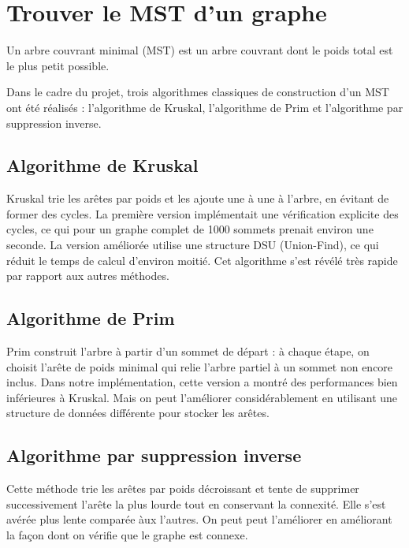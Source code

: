 \section{Trouver le MST d'un graphe}

Un arbre couvrant minimal (MST) est un arbre couvrant dont le poids total est le plus petit possible.

Dans le cadre du projet, trois algorithmes classiques de construction d'un MST ont été réalisés : l'algorithme de Kruskal, l'algorithme de Prim et l'algorithme par suppression inverse.

\subsection{Algorithme de Kruskal}
Kruskal trie les arêtes par poids et les ajoute une à une à l'arbre, en évitant de former des cycles.
La première version implémentait une vérification explicite des cycles, ce qui pour un graphe complet de 1000 sommets prenait environ une seconde.
La version améliorée utilise une structure DSU (Union-Find), ce qui réduit le temps de calcul d'environ moitié.
Cet algorithme s'est révélé très rapide par rapport aux autres méthodes.

\subsection{Algorithme de Prim}
Prim construit l'arbre à partir d'un sommet de départ : à chaque étape, on choisit l'arête de poids minimal qui relie l'arbre partiel à un sommet non encore inclus.
Dans notre implémentation, cette version a montré des performances bien inférieures à Kruskal.
Mais on peut l'améliorer considérablement en utilisant une structure de données différente pour stocker les arêtes.

\subsection{Algorithme par suppression inverse}
Cette méthode trie les arêtes par poids décroissant et tente de supprimer successivement l'arête la plus lourde tout en conservant la connexité.
Elle s'est avérée plus lente comparée àux l'autres.
On peut peut l'améliorer en améliorant la façon dont on vérifie que le graphe est connexe.
